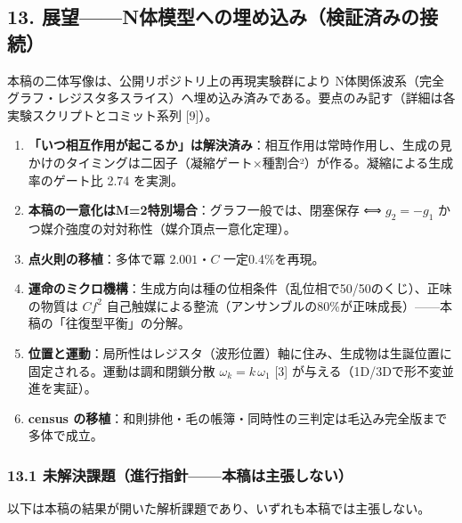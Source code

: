 \documentclass[
  a4paper,
]{ltjsarticle}
\providecommand{\tightlist}{%
  \setlength{\itemsep}{0pt}\setlength{\parskip}{0pt}}
\begin{document}
\subsection{13.
展望------N体模型への埋め込み（検証済みの接続）}\label{ux5c55ux671bnux4f53ux6a21ux578bux3078ux306eux57cbux3081ux8fbcux307fux691cux8a3cux6e08ux307fux306eux63a5ux7d9a}

本稿の二体写像は、公開リポジトリ上の再現実験群により
N体関係波系（完全グラフ・レジスタ多スライス）へ埋め込み済みである。要点のみ記す（詳細は各実験スクリプトとコミット系列
{[}9{]}）。

\begin{enumerate}
\def\labelenumi{\arabic{enumi}.}
\tightlist
\item
  \textbf{「いつ相互作用が起こるか」は解決済み}：相互作用は常時作用し、生成の見かけのタイミングは二因子（凝縮ゲート×種割合²）が作る。凝縮による生成率のゲート比
  2.74 を実測。
\item
  \textbf{本稿の一意化はM=2特別場合}：グラフ一般では、閉塞保存 ⟺
  \(g_2=-g_1\) かつ媒介強度の対対称性（媒介頂点一意化定理）。
\item
  \textbf{点火則の移植}：多体で冪 \(2.001\)・\(C\) 一定0.4\%を再現。
\item
  \textbf{運命のミクロ機構}：生成方向は種の位相条件（乱位相で50/50のくじ）、正味の物質は
  \(C f^2\)
  自己触媒による整流（アンサンブルの80\%が正味成長）------本稿の「往復型平衡」の分解。
\item
  \textbf{位置と運動}：局所性はレジスタ（波形位置）軸に住み、生成物は生誕位置に固定される。運動は調和閉鎖分散
  \(\omega_k = k\,\omega_1\) {[}3{]}
  が与える（1D/3Dで形不変並進を実証）。
\item
  \textbf{census
  の移植}：和則排他・毛の帳簿・同時性の三判定は毛込み完全版まで多体で成立。
\end{enumerate}

\subsubsection{13.1
未解決課題（進行指針------本稿は主張しない）}\label{ux672aux89e3ux6c7aux8ab2ux984cux9032ux884cux6307ux91ddux672cux7a3fux306fux4e3bux5f35ux3057ux306aux3044}

以下は本稿の結果が開いた解析課題であり、いずれも本稿では主張しない。
\end{document}
